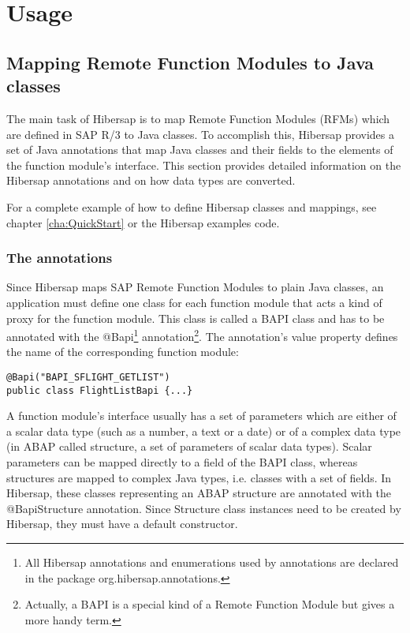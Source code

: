 \chapter{Usage}
\label{cha:Usage}

\section{Mapping Remote Function Modules to Java classes} 
\label{cha:Mapping}
The main task of Hibersap is to map Remote Function Modules (RFMs) which are defined in SAP R/3 to Java classes. To accomplish this, Hibersap provides a set of Java annotations that map Java classes and their fields to the elements of the function module's interface. This section provides detailed information on the Hibersap annotations and on how data types are converted.

For a complete example of how to define Hibersap classes and mappings, see chapter \ref{cha:QuickStart} or the Hibersap examples code.

\subsection{The annotations}
Since Hibersap maps SAP Remote Function Modules to plain Java classes, an application must define one class for each function module that acts a kind of proxy for the function module. This class is called a BAPI class and has to be annotated with the @Bapi\footnote{All Hibersap annotations and enumerations used by annotations are declared in the package org.hibersap.annotations.} annotation\footnote{Actually, a BAPI is a special kind of a Remote Function Module but gives a more handy term.}. The annotation's value property defines the name of the corresponding function module:

\begin{lstlisting}
@Bapi("BAPI_SFLIGHT_GETLIST") 
public class FlightListBapi {...}
\end{lstlisting}

A function module's interface usually has a set of parameters which are either of a scalar data type (such as a number, a text or a date) or of a complex data type (in ABAP called structure, a set of parameters of scalar data types). Scalar parameters can be mapped directly to a field of the BAPI class, whereas structures are mapped to complex Java types, i.e. classes with a set of fields. In Hibersap, these classes representing an ABAP structure are annotated with the @BapiStructure annotation. Since Structure class instances need to be created by Hibersap, they must have a default constructor.

